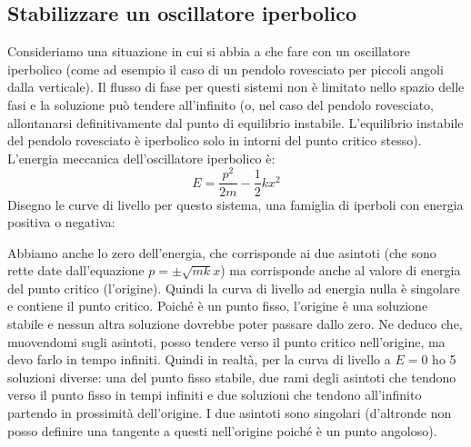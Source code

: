 \documentclass[a4paper,openany]{article}
\begin{document}
	\subsection{Stabilizzare un oscillatore iperbolico}
	Consideriamo una situazione in cui si abbia a che fare con un oscillatore iperbolico (come ad esempio il caso di un pendolo rovesciato per piccoli angoli dalla verticale). Il flusso di fase per questi sistemi non è limitato nello spazio delle fasi e la soluzione può tendere all'infinito (o, nel caso del pendolo rovesciato, allontanarsi definitivamente dal punto di equilibrio instabile. L'equilibrio instabile del pendolo rovesciato è iperbolico solo in intorni del punto critico stesso). L'energia meccanica dell'oscillatore iperbolico è:
	$$
	E = \dfrac{p^{2}}{2m} - \dfrac{1}{2}kx^{2}
	$$
	Disegno le curve di livello per questo sistema, una famiglia di iperboli con energia positiva o negativa:
	\begin{figure}[H]
		\centering
	\end{figure}
	Abbiamo anche lo zero dell'energia, che corrisponde ai due asintoti (che sono rette date dall'equazione $p=\pm\sqrt{mk}x$) ma corrisponde anche al valore di energia del punto critico (l'origine). Quindi la curva di livello ad energia nulla è singolare e contiene il punto critico.
	Poiché è un punto fisso, l'origine è una soluzione stabile e nessun altra soluzione dovrebbe poter passare dallo zero. Ne deduco che, muovendomi sugli asintoti, posso tendere verso il punto critico nell'origine, ma devo farlo in tempo infiniti. Quindi in realtà, per la curva di livello a $E=0$ ho 5 soluzioni diverse: una del punto fisso stabile, due rami degli asintoti che tendono verso il punto fisso in tempi infiniti e due soluzioni che tendono all'infinito partendo in prossimità dell'origine. I due asintoti sono singolari (d'altronde non posso definire una tangente a questi nell'origine poiché è un punto angoloso).
\end{document}
